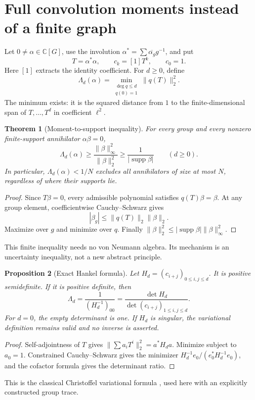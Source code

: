 \documentclass[11pt,a4paper,oneside]{report}
\newtheorem{theorem}{Theorem}[section]
\newtheorem{proposition}[theorem]{Proposition}
\theoremstyle{definition}
\theoremstyle{remark}
\DeclareMathOperator{\supp}{supp}
\newcommand{\C}{\mathbb C}
\newcommand{\ct}{[1]}
\begin{document}
\section{Full convolution moments instead of a finite graph}\label{M03:sec:moments}
Let \(0\ne\alpha\in\C[G]\), use the involution \(\alpha^*=\sum\overline{\alpha_g}g^{-1}\), and put
\[
T=\alpha^*\alpha,\qquad c_k=\ct T^k,\qquad c_0=1.
\]
Here \(\ct\) extracts the identity coefficient. For \(d\ge0\), define
\begin{equation}\label{M03:eq:Lambda}
\Lambda_d(\alpha)=
\min_{\substack{\deg q\le d\\q(0)=1}}\|q(T)\|_2^2.
\end{equation}
The minimum exists: it is the squared distance from \(1\) to the finite-dimensional span of \(T,\ldots,T^d\) in coefficient \(\ell^2\).

\begin{theorem}[Moment-to-support inequality]\label{M03:thm:moment}
For every group and every nonzero finite-support annihilator \(\alpha\beta=0\),
\begin{equation}\label{M03:eq:momentbound}
\boxed{\Lambda_d(\alpha)\ge
\frac{\|\beta\|_\infty^2}{\|\beta\|_2^2}
\ge\frac1{|\supp\beta|}\qquad(d\ge0).}
\end{equation}
In particular, \(\Lambda_d(\alpha)<1/N\) excludes all annihilators of size at most \(N\), regardless of where their supports lie.
\end{theorem}
\begin{proof}
Since \(T\beta=0\), every admissible polynomial satisfies \(q(T)\beta=\beta\). At any group element, coefficientwise Cauchy--Schwarz gives
\[
|\beta_g|\le\|q(T)\|_2\|\beta\|_2.
\]
Maximize over \(g\) and minimize over \(q\). Finally
\(\|\beta\|_2^2\le|\supp\beta|\|\beta\|_\infty^2\).
\end{proof}
This finite inequality needs no von Neumann algebra. Its mechanism is an uncertainty inequality, not a new abstract principle.

\begin{proposition}[Exact Hankel formula]\label{M03:prop:hankel}
Let \(H_d=(c_{i+j})_{0\le i,j\le d}\). It is positive semidefinite. If it is positive definite, then
\begin{equation}\label{M03:eq:inverseH}
\Lambda_d=
\frac1{(H_d^{-1})_{00}}
=\frac{\det H_d}{\det(c_{i+j})_{1\le i,j\le d}}.
\end{equation}
For \(d=0\), the empty determinant is one. If \(H_d\) is singular, the variational definition remains valid and no inverse is asserted.
\end{proposition}
\begin{proof}
Self-adjointness of \(T\) gives
\(\|\sum a_iT^i\|_2^2=a^*H_da\). Minimize subject to \(a_0=1\). Constrained Cauchy--Schwarz gives the minimizer
\(H_d^{-1}e_0/(e_0^*H_d^{-1}e_0)\), and the cofactor formula gives the determinant ratio.
\end{proof}
This is the classical Christoffel variational formula \cite[Theorem 9.2]{B:Simon}, used here with an explicitly constructed group trace.
\end{document}
